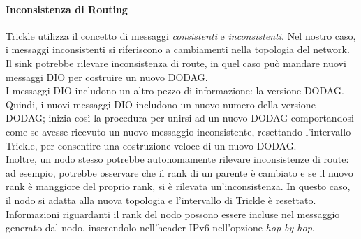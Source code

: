 \documentclass{article}
\begin{document}
\paragraph{Inconsistenza di Routing} Trickle utilizza il concetto di messaggi \textit{consistenti} e \textit{inconsistenti}. Nel nostro caso, i messaggi inconsistenti si riferiscono a cambiamenti nella topologia del network. Il sink potrebbe rilevare inconsistenza di route, in quel caso può mandare nuovi messaggi DIO per costruire un nuovo DODAG. \\ I messaggi DIO includono un altro pezzo di informazione: la versione DODAG. Quindi, i nuovi messaggi DIO includono un nuovo numero della versione DODAG; inizia così la procedura per unirsi ad un nuovo DODAG comportandosi come se avesse ricevuto un nuovo messaggio inconsistente, resettando l'intervallo Trickle, per consentire una costruzione veloce di un nuovo DODAG. \\ Inoltre, un nodo stesso potrebbe autonomamente rilevare inconsistenze di route: ad esempio, potrebbe osservare che il rank di un parente è cambiato e se il nuovo rank è manggiore del proprio rank, si è rilevata un'inconsistenza. In questo caso, il nodo si adatta alla nuova topologia e l'intervallo di Trickle è resettato. Informazioni riguardanti il rank del nodo possono essere incluse nel messaggio generato dal nodo, inserendolo nell'header IPv6 nell'opzione \textit{hop-by-hop}.
\end{document}
